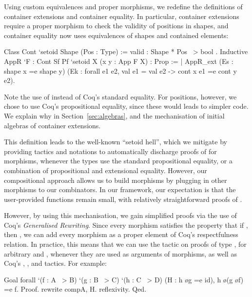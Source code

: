 \documentclass[ a4paper, UKenglish, cleveref, autoref, thm-restate]{lipics-v2021}
\begin{document}
Using custom equivalences and proper morphisms, we redefine the definitions of
container extensions and container equality. In particular, container
extensions require a proper morphism to check the validity of positions in
shapes, and container equality now uses equivalences of shapes and contained
elements: 
\begin{coqcode}
Class Cont `{setoid Shape} (Pos : Type) := { valid : Shape * Pos ~> bool }.
Inductive AppR `{F : Cont Sf Pf} `{setoid X} (x y : App F X) : Prop :=
  | AppR_ext (Es : shape x =e shape y)
             (Ek : forall e1 e2, val e1 = val e2 -> cont x e1 =e cont y e2).
\end{coqcode}
Note the use of  instead of Coq's standard equality.  For positions,
however, we chose to use Coq's propositional equality, since these would leads
to simpler code. We explain why in Section~\ref{sec:algebras}, and the
mechanisation of initial algebras of container extensions.

This definition leads to the well-known ``setoid hell'', which we mitigate by
providing tactics and notations to automatically discharge proofs of
 for morphisms, whenever the types use the standard propositional
equality, or a combination of propositional and extensional equality. However,
our compositional approach allows us to build morphisms by plugging in other
morphisms to our combinators. In our framework, our expectation is that the
user-provided functions remain small, with relatively straightforward proofs of
.

However, by using this mechanisation, we gain simplified proofs via the use of
Coq's \emph{Generalised Rewriting}. Since every morphism 
satisfies the property that if , then , we can add
every morphism as a proper element of Coq's respectfulness relation. In
practice, this means that we can use the  tactic on proofs of
type , for arbitrary  and , whenever they are used as
arguments of morphisms, as well as Coq's , ,
and  tactics. For example:
\begin{coqcode}
Goal forall `(f : A ~> B) `(g : B ~> C) `(h : C ~> D) (H : h \o g =e id), 
  h \o (g \o f) =e f.
Proof.  rewrite compA, H.  reflexivity. Qed.
\end{coqcode}
\end{document}
